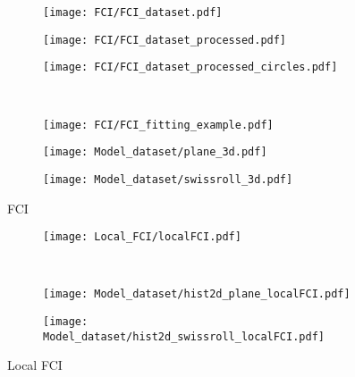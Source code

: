 \documentclass[11pt,a4paper]{article}
\author{Jacopo Fadanni}
\begin{document}
\begin{figure}
 \centering
 \begin{subfigure}[b]{0.32\textwidth}
   \centering
   \texttt{[image: FCI/FCI\_dataset.pdf]}
 \end{subfigure}\label{fig:FCIexpl:FCI_dataset}
 \begin{subfigure}[b]{0.32\textwidth}
   \centering
   \texttt{[image: FCI/FCI\_dataset\_processed.pdf]}
 \end{subfigure}\label{fig:FCIexpl:FCI_dataset_processed}
 \begin{subfigure}[b]{0.32\textwidth}
    \centering
    \texttt{[image: FCI/FCI\_dataset\_processed\_circles.pdf]}
  \end{subfigure}\label{fig:FCIexpl:FCI_dataset_processed_circles}\\
  \begin{subfigure}[b]{0.36\textwidth}
    \centering
    \texttt{[image: FCI/FCI\_fitting\_example.pdf]}
  \end{subfigure}\label{fig:FCIexpl:FCI_fitting_example}
  \begin{subfigure}[b]{0.30\textwidth}
    \centering
    \texttt{[image: Model\_dataset/plane\_3d.pdf]}
  \end{subfigure}\label{fig:FCIexpl:Model_dataset_plane_3d}
  \begin{subfigure}[b]{0.30\textwidth}
    \centering
    \texttt{[image: Model\_dataset/swissroll\_3d.pdf]}
  \end{subfigure}\label{fig:FCIexpl:Model_dataset_swissroll_3d}
 \caption{FCI}\label{fig:FCIexpl}
 \end{figure}


\begin{figure}
 \centering
 \begin{subfigure}[b]{\textwidth}
   \centering
   \texttt{[image: Local\_FCI/localFCI.pdf]}
 \end{subfigure}\label{fig:Local_FCI:localFCI}\\
 \begin{subfigure}[b]{0.45\textwidth}
   \centering
   \texttt{[image: Model\_dataset/hist2d\_plane\_localFCI.pdf]}
 \end{subfigure}\label{fig:Local_FCI:2dhist_plane}
 \begin{subfigure}[b]{0.45\textwidth}
   \centering
   \texttt{[image: Model\_dataset/hist2d\_swissroll\_localFCI.pdf]}
 \end{subfigure}\label{fig:Local_FCI:2dhist_swissroll}
 \caption{Local FCI}\label{fig:Local_FCI}
\end{figure}
\end{document}
